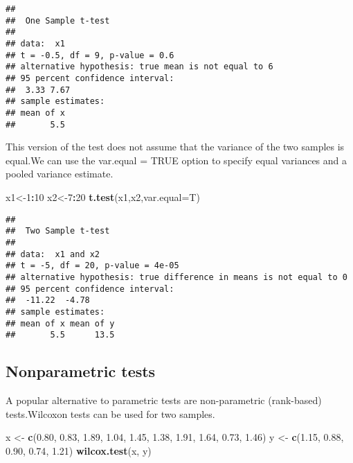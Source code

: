 \documentclass[]{book}
\newenvironment{Shaded}{\begin{snugshade}}{\end{snugshade}}
\newcommand{\KeywordTok}[1]{\textcolor[rgb]{0.13,0.29,0.53}{\textbf{#1}}}
\newcommand{\DataTypeTok}[1]{\textcolor[rgb]{0.13,0.29,0.53}{#1}}
\newcommand{\DecValTok}[1]{\textcolor[rgb]{0.00,0.00,0.81}{#1}}
\newcommand{\FloatTok}[1]{\textcolor[rgb]{0.00,0.00,0.81}{#1}}
\newcommand{\StringTok}[1]{\textcolor[rgb]{0.31,0.60,0.02}{#1}}
\newcommand{\OperatorTok}[1]{\textcolor[rgb]{0.81,0.36,0.00}{\textbf{#1}}}
\newcommand{\NormalTok}[1]{#1}
\theoremstyle{definition}
\theoremstyle{definition}
\theoremstyle{definition}
\theoremstyle{remark}
\begin{document}
\begin{verbatim}
## 
##  One Sample t-test
## 
## data:  x1
## t = -0.5, df = 9, p-value = 0.6
## alternative hypothesis: true mean is not equal to 6
## 95 percent confidence interval:
##  3.33 7.67
## sample estimates:
## mean of x 
##       5.5
\end{verbatim}

This version of the test does not assume that the variance of the two
samples is equal.We can use the var.equal = TRUE option to specify equal
variances and a pooled variance estimate.

\begin{Shaded}
\begin{Highlighting}[]
\NormalTok{x1<-}\DecValTok{1}\OperatorTok{:}\DecValTok{10}
\NormalTok{x2<-}\DecValTok{7}\OperatorTok{:}\DecValTok{20}
\KeywordTok{t.test}\NormalTok{(x1,x2,}\DataTypeTok{var.equal=}\NormalTok{T)}
\end{Highlighting}
\end{Shaded}

\begin{verbatim}
## 
##  Two Sample t-test
## 
## data:  x1 and x2
## t = -5, df = 20, p-value = 4e-05
## alternative hypothesis: true difference in means is not equal to 0
## 95 percent confidence interval:
##  -11.22  -4.78
## sample estimates:
## mean of x mean of y 
##       5.5      13.5
\end{verbatim}

\subsection{Nonparametric tests}\label{nonparametric-tests}

A popular alternative to parametric tests are non-parametric
(rank-based) tests.Wilcoxon tests can be used for two samples.

\begin{Shaded}
\begin{Highlighting}[]
\NormalTok{x <-}\StringTok{ }\KeywordTok{c}\NormalTok{(}\FloatTok{0.80}\NormalTok{, }\FloatTok{0.83}\NormalTok{, }\FloatTok{1.89}\NormalTok{, }\FloatTok{1.04}\NormalTok{, }\FloatTok{1.45}\NormalTok{, }\FloatTok{1.38}\NormalTok{, }\FloatTok{1.91}\NormalTok{, }\FloatTok{1.64}\NormalTok{, }\FloatTok{0.73}\NormalTok{, }\FloatTok{1.46}\NormalTok{)}
\NormalTok{y <-}\StringTok{ }\KeywordTok{c}\NormalTok{(}\FloatTok{1.15}\NormalTok{, }\FloatTok{0.88}\NormalTok{, }\FloatTok{0.90}\NormalTok{, }\FloatTok{0.74}\NormalTok{, }\FloatTok{1.21}\NormalTok{)}
\KeywordTok{wilcox.test}\NormalTok{(x, y)        }
\end{Highlighting}
\end{Shaded}
\end{document}
